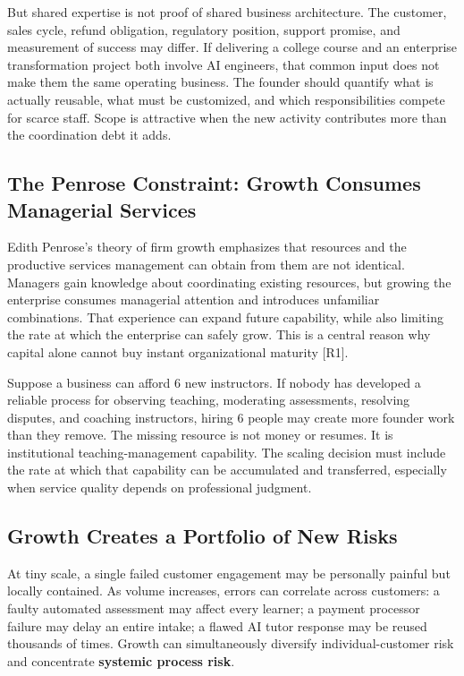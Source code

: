 But shared expertise is not proof of shared business architecture. The customer, sales cycle, refund obligation, regulatory position, support promise, and measurement of success may differ. If delivering a college course and an enterprise transformation project both involve AI engineers, that common input does not make them the same operating business. The founder should quantify what is actually reusable, what must be customized, and which responsibilities compete for scarce staff. Scope is attractive when the new activity contributes more than the coordination debt it adds.

\subsection{The Penrose Constraint: Growth Consumes Managerial Services}
\label{sec:penrose_constraint}

Edith Penrose's theory of firm growth emphasizes that resources and the productive services management can obtain from them are not identical. Managers gain knowledge about coordinating existing resources, but growing the enterprise consumes managerial attention and introduces unfamiliar combinations. That experience can expand future capability, while also limiting the rate at which the enterprise can safely grow. This is a central reason why capital alone cannot buy instant organizational maturity [R1].

Suppose a business can afford 6 new instructors. If nobody has developed a reliable process for observing teaching, moderating assessments, resolving disputes, and coaching instructors, hiring 6 people may create more founder work than they remove. The missing resource is not money or resumes. It is institutional teaching-management capability. The scaling decision must include the rate at which that capability can be accumulated and transferred, especially when service quality depends on professional judgment.

\subsection{Growth Creates a Portfolio of New Risks}
\label{sec:growth_creates_new_risks}

At tiny scale, a single failed customer engagement may be personally painful but locally contained. As volume increases, errors can correlate across customers: a faulty automated assessment may affect every learner; a payment processor failure may delay an entire intake; a flawed AI tutor response may be reused thousands of times. Growth can simultaneously diversify individual-customer risk and concentrate \textbf{systemic process risk}.

